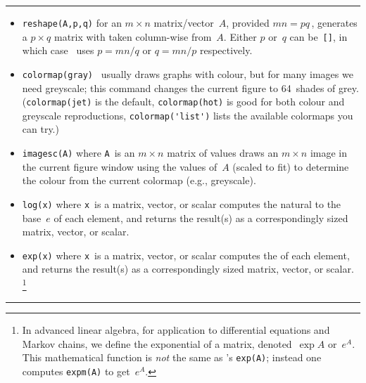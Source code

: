 \begin{table}
\caption{As well as the \script\ commands and operations listed in \cref{tbl:mtlbpre,tbl:mtlbbasics,tbl:mtlbops,tbl:mtlbmops,tbl:mtlbsvd}  we may invoke these functions for drawing images---functions which are otherwise not needed.} \label{tbl:mtlbimag}
\smallskip\hrule\smallskip
\begin{minipage}{\linewidth}
\begin{itemize}

\item {}\verb|reshape(A,p,q)| for an \(m\times n\) matrix\slash vector~\(A\), provided \(mn=pq\)\,, generates a \(p\times q\) matrix with  taken column-wise from~\(A\).  
Either \(p\) or~\(q\) can be~\verb|[]|, in which case \script\ uses \(p=mn/q\) or \(q=mn/p\) respectively.

\item {}\verb|colormap(gray)| \script\ usually draws graphs with colour, but for many images we need greyscale; this command changes the current figure to 64~shades of grey.  
(\verb|colormap(jet)| is the default, \verb|colormap(hot)| is good for both colour and greyscale reproductions, \verb|colormap('list')| lists the available colormaps you can try.)

\item {}\verb|imagesc(A)| where \verb|A|~is an \(m\times n\) matrix of values draws an \(m\times n\) image in the current figure window using the values of~\(A\) (scaled to fit) to determine the colour from the current colormap (e.g., greyscale).

\item {}\verb|log(x)| where \verb|x|~is a  matrix, vector, or scalar computes the natural  to the base~\(e\) of each element, and returns the result(s) as a correspondingly sized matrix, vector, or scalar.

\item {}\verb|exp(x)| where \verb|x|~is a  matrix, vector, or scalar computes the  of each element, and returns the result(s) as a correspondingly sized matrix, vector, or scalar.%
\footnote{In advanced linear algebra, for application to differential equations and Markov chains, we define the exponential of a matrix, denoted~\(\exp A\) or~\(e^A\).  
This mathematical function is \emph{not} the same as \script's \texttt{exp(A)}; instead one computes \texttt{expm(A)} to get~\(e^A\).}

\end{itemize}
\end{minipage}
\smallskip\hrule
\end{table}









